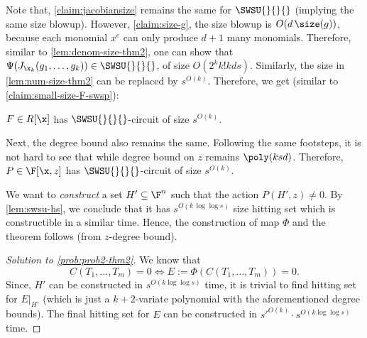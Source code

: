 Note that, \autoref{claim:jacobiansize} remains the same for $\SWSU{}{}{}$ (implying the same size blowup). However, \autoref{claim:size-g}, the size blowup is $O(d\,\size(g))$, because each monomial $x^e$ can only produce $d+1$ many monomials. Therefore, similar to \autoref{lem:denom-size-thm2}, one can show that $\Psi(J_{\x_k}(g_1,\hdots,g_k)) \in \SWSU{}{}{}$, of size $O(2^kk!kds)$. Similarly, the size in \autoref{lem:num-size-thm2} can be replaced by $s^{O(k)}$. Therefore, we get (similar to \autoref{claim:small-size-F-swsp}):

\begin{claim}
$F \in R[\x]$ has $\SWSU{}{}{}$-circuit of size $s^{O(k)}$.
\end{claim}

Next, the degree bound also remains the same. Following the same footsteps, it is not hard to see that 
%
while degree bound on $z$ remains $\poly(ksd)$. Therefore, $P \in \F[\x,z]$ has $\SWSU{}{}{}$-circuit of size $s^{O(k)}$.

We want to \emph{construct} a set $H' \subseteq \F^n$ such that the action $P(H',z) \ne 0$.  By \autoref{lem:swsu-hs}, we conclude that it has $s^{O(k\,\log \log s)}$ size hitting set  which is constructible in a similar time. Hence, the construction of map $\Phi$ and the theorem follows (from $z$-degree bound).


\begin{proof}[Solution to \autoref{prob:prob2-thm2}]
We know that \[C(T_1,\hdots,T_m) = 0 \iff E:= \Phi(C(T_1,\hdots,T_m)) =0.\] 
Since, $H'$ can be constructed in $s^{O(k \log \log s)}$ time, it is trivial to find hitting set for $E\rvert_{H'}$ (which is just a $k+2$-variate polynomial with the aforementioned degree bounds). The final hitting set for $E$ can be constructed in $s'^{O(k)} \cdot s^{O(k \log \log s)}$ time.
\end{proof}
